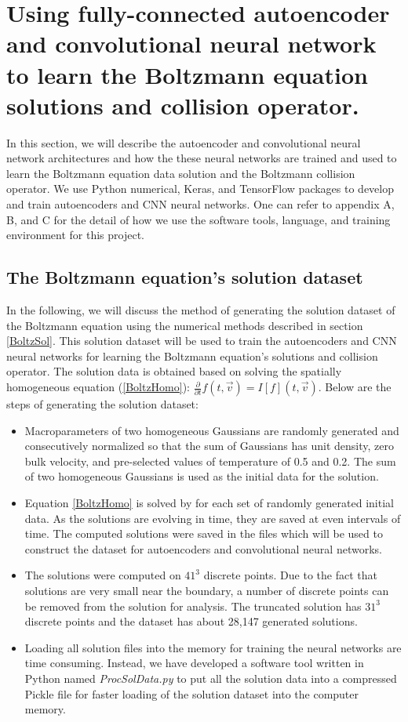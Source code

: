 \documentclass{article}
\begin{document}
\section{Using fully-connected autoencoder and convolutional neural network to learn the Boltzmann equation solutions and collision operator.}
In this section, we will describe the autoencoder and convolutional neural network architectures and how the these neural networks are trained and used to learn the Boltzmann equation data solution and the Boltzmann collision operator. We use Python numerical, Keras, and TensorFlow packages to develop and train autoencoders and CNN neural networks. One can refer to appendix A, B, and C for the detail of how we use the software tools, language, and training environment for this project. 

\subsection{The Boltzmann equation's solution dataset} \label{dataset}
In the following, we will discuss the method of generating the solution dataset of the Boltzmann equation using the numerical methods described in section \ref{BoltzSol}. This solution dataset will be used to train the autoencoders and CNN neural networks for learning the Boltzmann equation's solutions and collision operator. The solution data is obtained based on solving the spatially homogeneous equation (\ref{BoltzHomo}): $\frac{\partial}{\partial t}f(t,\vec{v}) = I[f](t, \vec{v})$. Below are the steps of generating the solution dataset:
\begin{itemize}
	\item Macroparameters of two homogeneous Gaussians are randomly generated and consecutively normalized so that the sum of Gaussians has unit density, zero bulk velocity, and pre-selected values of temperature of 0.5 and 0.2. The sum of two homogeneous Gaussians is used as the initial data for the solution.
	\item Equation \ref{BoltzHomo} is solved by \cite{Alekseenko4} for each set of randomly generated initial data. As the solutions are evolving in time, they are saved at even intervals of time. The computed solutions were saved in the files which will be used to construct the dataset for autoencoders and convolutional neural networks.
	\item The solutions were computed on $41^3$ discrete points. Due to the fact that solutions are very small near the boundary, a number of discrete points can be removed from the solution for analysis. The truncated solution has $31^3$ discrete points and the dataset has about 28,147  generated solutions.
	\item Loading all solution files into the memory for training the neural networks are time consuming. Instead, we have developed a software tool written in Python named \emph{ProcSolData.py} to put all the solution data into a compressed Pickle file for faster loading of the solution dataset into the computer memory.
	
\end{itemize}
\end{document}
